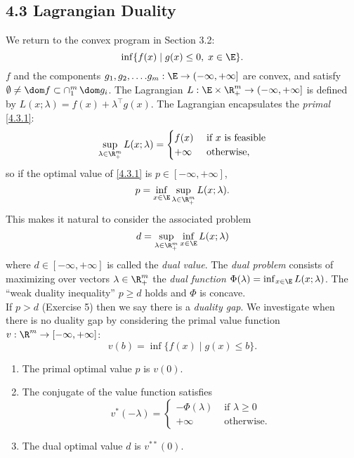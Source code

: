 \documentclass[../borwein-lewis_notes.tex]{subfiles}
\begin{document}
\maketitle
\subsection{4.3 Lagrangian Duality}
We return to the convex program in Section 3.2: 
\begin{equation}
\inf\{f(x)\mid g(x)\leq 0,\; x\in \E\}.
\label{4.3.1}
\end{equation}
$f$ and the components $g_1,g_2,\ldots. g_m:\E\to(-\infty,+\infty]$ 
are convex, and satisfy $\emptyset\neq\dom f\subset \cap_1^m\,\dom g_i$.
The Lagrangian $L:\E\times\R_+^m\to(-\infty, +\infty]$ is defined by 
$L(x;\lambda)= f(x) + \lambda^\top g(x)$. The Lagrangian encapsulates 
the \textit{primal} \eqref{4.3.1}: 
\begin{equation*}
\sup_{\lambda\in\R_+^m} L(x;\lambda)=\begin{cases} f(x) &\text{ if }x 
\text{ is feasible}\\
+\infty & \text{ otherwise},
\end{cases}
\end{equation*}
so if the optimal value of \eqref{4.3.1} is $p\in[-\infty,+\infty]$, 
\begin{equation}
\label{4.3.2}
p=\inf_{x\in\E}\sup_{\lambda\in\R_+^m} L(x;\lambda).
\end{equation}
This makes it natural to consider the associated problem 
\begin{equation}
d = \sup_{\lambda\in\R_+^m}\inf_{x\in\E} L(x;\lambda)
\label{4.3.3}
\end{equation}
where $d\in[-\infty,+\infty]$ is called the \textit{dual value}. The 
\textit{dual problem} consists of maximizing over vectors $\lambda\in
\R_+^m$ the \textit{dual function} $\Phi(\lambda)=\inf_{x\in\E}L(x;
\lambda)$. The ``weak duality inequality'' $p\geq d$ holds and 
$\Phi$ is concave. \\
If $p>d$ (Exercise 5) then we say there is a \textit{duality gap}. We 
investigate when there is no duality gap by considering the primal 
value function $v:\R^m\to[-\infty,+\infty]$:
\begin{equation}
v(b) = \inf\{f(x)\mid g(x)\leq b\}.
\label{4.3.4}
\end{equation}
\begin{proposition}
\begin{enumerate}
\item The primal optimal value $p$ is $v(0)$.
\item The conjugate of the value function satisfies 
\begin{equation*}
v^*(-\lambda) = \begin{cases} -\Phi(\lambda) & \text{ if }\lambda\geq 0\\
+\infty & \text{ otherwise.}
\end{cases}
\end{equation*}
\item The dual optimal value $d$ is $v^{**}(0)$.
\end{enumerate}
\label{4.3.5}
\end{proposition}
\end{document}
